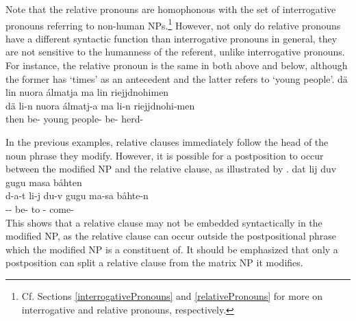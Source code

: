Note that the relative pronouns are homophonous with the %
set of interrogative pronouns referring to non-human NPs.\footnote{Cf. Sections \ref{interrogativePronouns} and \ref{relativePronouns} for more on interrogative and relative pronouns, respectively.} 
However, not only do relative pronouns have a different syntactic function than interrogative pronouns in general, they are not sensitive to the humanness of the referent, unlike interrogative pronouns. For instance, the relative pronoun  is the same in both  above and  below, although the former has ‘times’ as an antecedent and the latter refers to ‘young people’.
\ea\label{relClause5}%
\glll	dä lin nuora álmatja ma lin riejjdnohimen\\
	dä li-n nuora álmatj-a ma li-n riejjdnohi-men\\
	then be- young\BS{} people- \BS{} be- herd-\\\nopagebreak
{} 
\z

In the previous examples, relative clauses immediately follow the head of the noun phrase they modify. However, it is possible for a postposition to occur between the modified NP and the relative clause, as illustrated by . 
\ea\label{relClause6}%
\glll	dat lij duv gugu masa båhten\\
	d-a-t li-j du-v gugu ma-sa båhte-n\\
	-- be-  to - come-\\\nopagebreak
{} 
\z
This shows that a relative clause may not be embedded syntactically in the modified NP, as the relative clause can occur outside the postpositional phrase which the modified NP is a constituent of. It should be emphasized that only a postposition can split a relative clause from the matrix NP it modifies.

